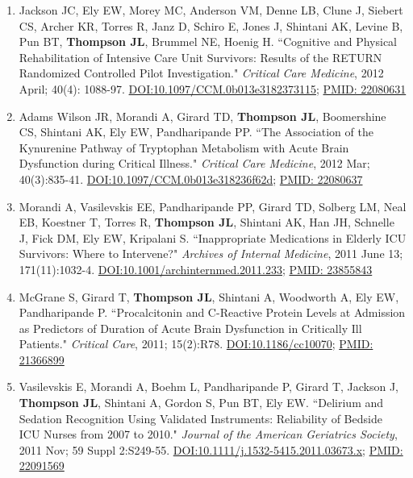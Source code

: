 \documentclass[5pt]{article}
\begin{document}
\begin{enumerate}
\item Jackson JC, Ely EW, Morey MC, Anderson VM, Denne LB, Clune J, Siebert CS, Archer KR, Torres R, Janz D, Schiro E, Jones J, Shintani AK, Levine B, Pun BT, \textbf{Thompson JL}, Brummel NE, Hoenig H. ``Cognitive and Physical Rehabilitation of Intensive Care Unit Survivors: Results of the RETURN Randomized Controlled Pilot Investigation." \emph{Critical Care Medicine}, 2012 April; 40(4): 1088-97. \href{https://doi.org/10.1097/CCM.0b013e3182373115}{DOI:10.1097/CCM.0b013e3182373115}; \href{https://www.ncbi.nlm.nih.gov/pubmed/22080631}{PMID: 22080631}
\item Adams Wilson JR, Morandi A, Girard TD, \textbf{Thompson JL}, Boomershine CS, Shintani AK, Ely EW, Pandharipande PP. ``The Association of the Kynurenine Pathway of Tryptophan Metabolism with Acute Brain Dysfunction during Critical Illness." \emph{Critical Care Medicine}, 2012 Mar; 40(3):835-41. \href{https://doi.org/10.1097/CCM.0b013e318236f62d}{DOI:10.1097/CCM.0b013e318236f62d}; \href{https://www.ncbi.nlm.nih.gov/pubmed/22080637}{PMID: 22080637}
\item Morandi A, Vasilevskis EE, Pandharipande PP, Girard TD, Solberg LM, Neal EB, Koestner T, Torres R, \textbf{Thompson JL}, Shintani AK, Han JH, Schnelle J, Fick DM, Ely EW, Kripalani S. ``Inappropriate Medications in Elderly ICU Survivors: Where to Intervene?" \emph{Archives of Internal Medicine}, 2011 June 13; 171(11):1032-4. \href{https://doi.org/10.1001/archinternmed.2011.233}{DOI:10.1001/archinternmed.2011.233}; \href{https://www.ncbi.nlm.nih.gov/pubmed/23855843}{PMID: 23855843}
\item McGrane S, Girard T, \textbf{Thompson JL}, Shintani A, Woodworth A, Ely EW, Pandharipande P. ``Procalcitonin and C-Reactive Protein Levels at Admission as Predictors of Duration of Acute Brain Dysfunction in Critically Ill Patients." \emph{Critical Care}, 2011; 15(2):R78. \href{https://doi.org/10.1186/cc10070}{DOI:10.1186/cc10070}; \href{https://www.ncbi.nlm.nih.gov/pubmed/21366899}{PMID: 21366899}
\item Vasilevskis E, Morandi A, Boehm L, Pandharipande P, Girard T, Jackson J, \textbf{Thompson JL}, Shintani A, Gordon S, Pun BT, Ely EW. ``Delirium and Sedation Recognition Using Validated Instruments: Reliability of Bedside ICU Nurses from 2007 to 2010." \emph{Journal of the American Geriatrics Society}, 2011 Nov; 59 Suppl 2:S249-55. \href{https://doi.org/10.1111/j.1532-5415.2011.03673.x}{DOI:10.1111/j.1532-5415.2011.03673.x}; \href{https://www.ncbi.nlm.nih.gov/pubmed/22091569}{PMID: 22091569}

\end{enumerate}
\end{document}
